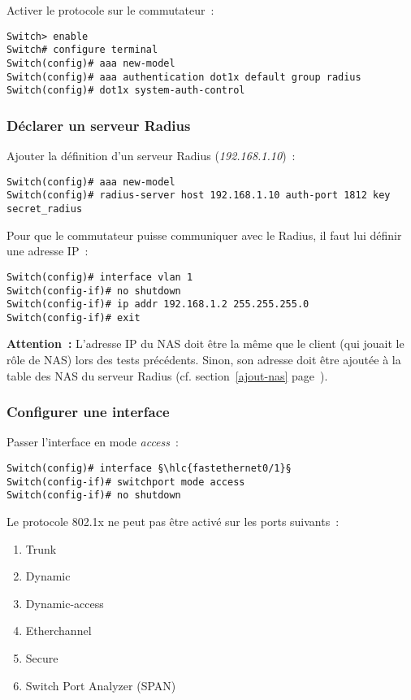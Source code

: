 Activer le protocole sur le commutateur~:

\begin{lstlisting}
Switch> enable
Switch# configure terminal
Switch(config)# aaa new-model
Switch(config)# aaa authentication dot1x default group radius
Switch(config)# dot1x system-auth-control
\end{lstlisting}

\subsubsection{Déclarer un serveur Radius}

Ajouter la définition d'un serveur Radius (\emph{192.168.1.10})~:

\begin{lstlisting}
Switch(config)# aaa new-model
Switch(config)# radius-server host 192.168.1.10 auth-port 1812 key secret_radius
\end{lstlisting}

Pour que le commutateur puisse communiquer avec le Radius, il faut lui définir une adresse IP~:

\begin{lstlisting}
Switch(config)# interface vlan 1
Switch(config-if)# no shutdown
Switch(config-if)# ip addr 192.168.1.2 255.255.255.0
Switch(config-if)# exit
\end{lstlisting}

\textbf{{\huge\Stopsign} Attention~:} L'adresse IP du NAS doit être la même que le client (qui jouait le rôle de NAS) lors des tests précédents. Sinon, son adresse doit être ajoutée à la table des NAS du serveur Radius (cf. section~\ref{ajout-nas} page~\pageref{ajout-nas}).

\subsubsection{Configurer une interface}

Passer l'interface en mode \emph{access}~:

\begin{lstlisting}
Switch(config)# interface §\hlc{fastethernet0/1}§
Switch(config-if)# switchport mode access
Switch(config-if)# no shutdown
\end{lstlisting}

Le protocole 802.1x ne peut pas être activé sur les ports suivants~:

\begin{enumerate}
\item Trunk
\item Dynamic
\item Dynamic-access
\item Etherchannel
\item Secure
\item Switch Port Analyzer (SPAN)
\end{enumerate}

